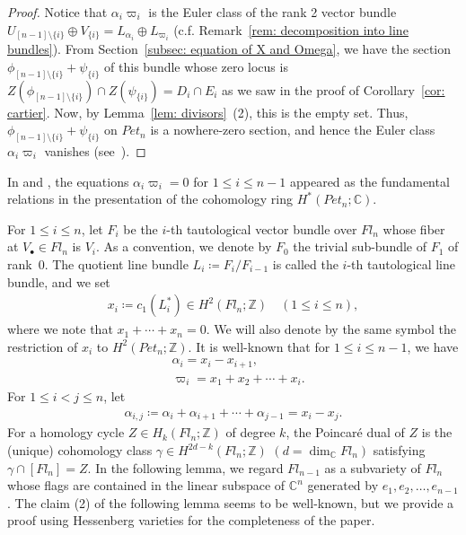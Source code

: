\begin{proof}
Notice that $\alpha_i \varpi_i$ is the Euler class of the rank 2 vector bundle $U_{[n-1]\setminus\{i\}}\oplus V_{\{i\}}=L_{\alpha_i}\oplus L_{\varpi_i}$ (c.f. Remark~\ref{rem: decomposition into line bundles}). From Section~\ref{subsec: equation of X and Omega}, we have the section $\phi_{[n-1]\setminus\{i\}}+\psi_{\{i\}}$ of this bundle whose zero locus is $Z(\phi_{[n-1]\setminus\{i\}})\cap Z(\psi_{\{i\}})=D_i\cap E_i$ as we saw in the proof of Corollary~\ref{cor: cartier}.
Now, by Lemma~\ref{lem: divisors}~(2), this is the empty set. Thus,~$\phi_{[n-1]\setminus\{i\}}+\psi_{\{i\}}$ on $Pet_{n}$ is a nowhere-zero section, and hence the Euler class $\alpha_i \varpi_i$ vanishes (see~\cite[Property 9.7]{Milnor-Stasheff}).
\end{proof}

\begin{rema}\label{rem: fundamental rel}
In \cite[Corollary~3.4]{fu-ha-ma} and \cite[Theorem 4.1]{ha-ho-ma}, the equations $\alpha_i \varpi_i = 0$ for $1\le i\le n-1$ appeared as the fundamental relations in the presentation of the cohomology ring $H^*(Pet_{n};{\mathbb C})$. 
\end{rema}

For $1\le i\le n$, let $F_i$ be the $i$-th tautological vector bundle over $Fl_n$ whose fiber at $V_{\bullet}\in Fl_n$ is $V_i$. As a convention, we denote by $F_0$ the trivial sub-bundle of $F_1$ of rank~$0$. The quotient line bundle $L_i\coloneqq F_i/F_{i-1}$ is called the $i$-th tautological line bundle, and we set 
\begin{align} \label{eq:xi}
x_i \coloneqq c_1(L_i^*) \in H^2(Fl_n;{\mathbb Z})
\quad (1\le i\le n),
\end{align}
where we note that $x_1+\cdots+x_n=0$. We will also denote by the same symbol the restriction of $x_i$ to $H^2(Pet_{n};{\mathbb Z})$. It is well-known that for $1\le i\le n-1$, we have 
\begin{equation}\label{eq: pi and x}
\begin{split}
&\alpha_i = x_i-x_{i+1}, \\
&\varpi_i = x_1+x_2+\cdots+x_i.
\end{split}
\end{equation}
For $1\le i<j\le n$, let
\begin{align*}
\alpha_{i,j}\coloneqq \alpha_i+\alpha_{i+1}+\cdots+\alpha_{j-1}=x_i-x_j.
\end{align*}
For a homology cycle $Z\in H_{k}(Fl_n;{\mathbb Z})$ of degree $k$, the Poincar\'{e} dual of $Z$ is the (unique) cohomology class $\gamma\in H^{2d-k}(Fl_n;{\mathbb Z})$ $(d=\dim_{{\mathbb C}}Fl_n)$ satisfying $\gamma\cap[Fl_n]=Z$. In the following lemma, we regard $Fl_{n-1}$ as a subvariety of $Fl_n$ whose flags are contained in the linear subspace of ${\mathbb C}^n$ generated by $e_1,e_2,\ldots,e_{n-1}$.
The claim (2) of the following lemma seems to be well-known, but we provide a proof using Hessenberg varieties for the completeness of the paper.

